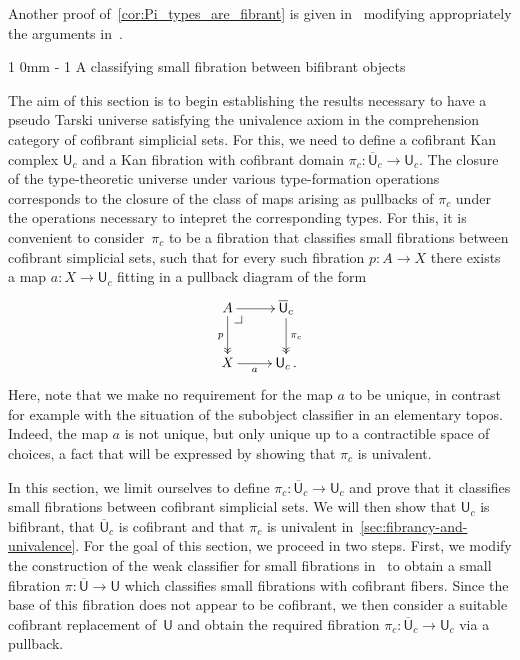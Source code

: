 \documentclass[reqno,10pt,a4paper,oneside]{amsart}
\makeatletter
\renewcommand{\section}{\@startsection
{section}%
{1}%
{0mm}%
{-\baselineskip}%
{1\baselineskip}%
{\Large \bfseries}}%
\numberwithin{equation}{section}
\theoremstyle{mythm}
\theoremstyle{mydef}
\theoremstyle{myrmk}
\newcommand{\pullback}[1]{\save*!/#1-1.2pc/#1:(-1,1)@^{|-}\restore}
\newcommand{\drpullback}{\pullback{dr}}
\newcommand{\ie}{\text{i.e.\ }}
\newcommand{\co}{\colon}
\newcommand{\UU}{\overline{\mathsf{U}}}
\newcommand{\U}{\mathsf{U}}
\makeatother
\begin{document}
 
 Another proof of~\cref{cor:Pi_types_are_fibrant} is given in~\cite{GambinoN:anocp} modifying appropriately
the arguments in~\cite{SattlerC:equepu}.


\section{A  classifying small fibration between bifibrant objects}
\label{sec:unifbb}


The aim of this section is to begin establishing the results necessary to have a pseudo Tarski
universe satisfying the univalence axiom in the comprehension category of cofibrant simplicial
sets. For this, we need to define a cofibrant Kan complex $\U_c$ and a Kan 
fibration with cofibrant domain $\pi_c \co \UU_c \to \U_c$. The closure of the type-theoretic universe under various type-formation operations
corresponds to the closure of the class of maps arising as pullbacks of $\pi_c$ under the 
operations necessary to intepret the corresponding types. For this, it is convenient to 
consider~$\pi_c$ to be a fibration that classifies small fibrations between cofibrant simplicial
sets, \ie such that for every such fibration $p \co A \to X$ there exists a map $a \co X \to \U_c$ fitting in a pullback diagram of the form
\[
\xymatrix{
A \drpullback \ar[r] \ar@{->>}[d]_p   & \UU_c \ar@{->>}[d]^{\pi_c} \\
X \ar[r]_-a &  \U_c \, .}
\]
Here, note that we make no requirement for
the map $a$ to be unique, in contrast for example with the situation of the subobject classifier
in an elementary topos. Indeed, the map $a$ is not unique, but only unique  up to a contractible space
of choices, a fact that will be expressed by showing that $\pi_c$ is univalent. 

In this section, we limit ourselves to define $\pi_c \co \UU_c \to \U_c$ and prove that it
classifies small fibrations between cofibrant simplicial sets. We will then show 
that $\U_c$ is bifibrant, that $\UU_c$ is cofibrant  and that $\pi_c$ is univalent 
in~\cref{sec:fibrancy-and-univalence}. For the goal of this section, we proceed in two steps. First, we modify  the construction of the weak classifier for small fibrations in~\cite{voevodsky-simplicial-model} to obtain a small fibration $\pi \co \UU \to \U$ which classifies small fibrations with cofibrant fibers. Since the base of this fibration does not appear to be cofibrant,
we then consider a suitable cofibrant replacement  of~$\U$ and obtain the required fibration $\pi_c \co \UU_c \to \U_c$ via a pullback. 
\end{document}
